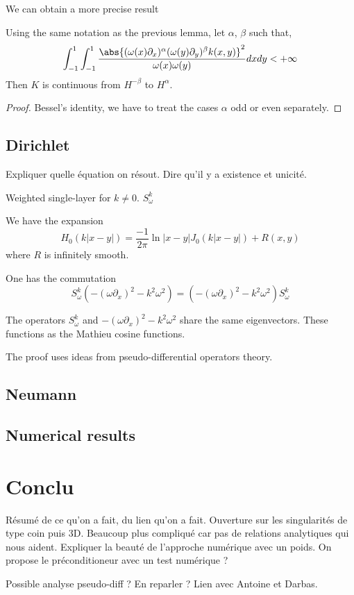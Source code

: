 \documentclass[]{article}
\begin{document}
We can obtain a more precise result

\begin{Lem}
	Using the same notation as the previous lemma, let $\alpha$, $\beta$ such that, 
	\[\int_{-1}^{1} \int_{-1}^{1}\dfrac{\abs{(\omega(x)\partial_x)^{\alpha} (\omega(y)\partial_y)^{\beta}k(x,y)}^2}{\omega(x)\omega(y)}dxdy < +\infty\]
	Then $K$ is continuous from $H^{-\beta}$ to $H^{\alpha}$. 
	\begin{proof}
		Bessel's identity, we have to treat the cases $\alpha$ odd or even separately.  
	\end{proof}
	
\end{Lem}


\subsection{Dirichlet}

Expliquer quelle équation on résout. Dire qu'il y a existence et unicité. 

\begin{Def}
	Weighted single-layer for $k\neq 0$. $S^k_\omega$ 
\end{Def}
We have the expansion
\[H_0(k|x-y|) = \frac{-1}{2\pi} \ln|x-y| J_0(k |x-y|) + R(x,y)\]
where $R$ is infinitely smooth. 
\begin{The}
	One has the commutation 
	\[S^k_\omega(-(\omega \partial_x)^2 - k^2\omega^2) =  (-(\omega \partial_x)^2 - k^2\omega^2)S^k_\omega \]
\end{The}
\begin{Rem}
	The operators $S^k_\omega$ and $-(\omega \partial_x)^2 - k^2\omega^2$ share the same eigenvectors. These functions as the Mathieu cosine functions. 
\end{Rem}

\begin{Rem}
	The proof uses ideas from pseudo-differential operators theory. 
\end{Rem}

\subsection{Neumann}

\subsection{Numerical results}


\section{Conclu}

Résumé de ce qu'on a fait, du lien qu'on a fait. Ouverture sur les singularités de type coin puis 3D. Beaucoup plus compliqué car pas de relations analytiques qui nous aident. 
Expliquer la beauté de l'approche numérique avec un poids. On propose le préconditioneur avec un test numérique ? 

Possible analyse pseudo-diff ? En reparler ? Lien avec Antoine et Darbas. 



\end{document}

